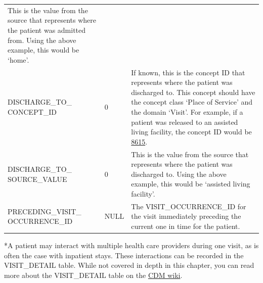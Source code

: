 \documentclass[11pt]{book}
\begin{document}
\begin{longtable}[]{@{}lll@{}}
\begin{minipage}[t]{0.49\columnwidth}
This is the value from the source that represents where the patient was
admitted from. Using the above example, this would be `home'.\strut
\end{minipage}\tabularnewline
\begin{minipage}[t]{0.27\columnwidth}\raggedright\strut
DISCHARGE\_TO\_ CONCEPT\_ID\strut
\end{minipage} & \begin{minipage}[t]{0.15\columnwidth}\raggedright\strut
0\strut
\end{minipage} & \begin{minipage}[t]{0.49\columnwidth}\raggedright\strut
If known, this is the concept ID that represents where the patient was
discharged to. This concept should have the concept class `Place of
Service' and the domain `Visit'. For example, if a patient was released
to an assisted living facility, the concept ID would be
\href{http://athena.ohdsi.org/search-terms/terms/8615}{8615}.\strut
\end{minipage}\tabularnewline
\begin{minipage}[t]{0.27\columnwidth}\raggedright\strut
DISCHARGE\_TO\_ SOURCE\_VALUE\strut
\end{minipage} & \begin{minipage}[t]{0.15\columnwidth}\raggedright\strut
0\strut
\end{minipage} & \begin{minipage}[t]{0.49\columnwidth}\raggedright\strut
This is the value from the source that represents where the patient was
discharged to. Using the above example, this would be `assisted living
facility'.\strut
\end{minipage}\tabularnewline
\begin{minipage}[t]{0.27\columnwidth}\raggedright\strut
PRECEDING\_VISIT\_ OCCURRENCE\_ID\strut
\end{minipage} & \begin{minipage}[t]{0.15\columnwidth}\raggedright\strut
NULL\strut
\end{minipage} & \begin{minipage}[t]{0.49\columnwidth}\raggedright\strut
The VISIT\_OCCURRENCE\_ID for the visit immediately preceding the
current one in time for the patient.\strut
\end{minipage}\tabularnewline
\bottomrule
\end{longtable}

*A patient may interact with multiple health care providers during one
visit, as is often the case with inpatient stays. These interactions can
be recorded in the VISIT\_DETAIL table. While not covered in depth in
this chapter, you can read more about the VISIT\_DETAIL table on the
\href{https://github.com/OHDSI/CommonDataModel/wiki/VISIT_DETAIL}{CDM
wiki}.
\end{document}
